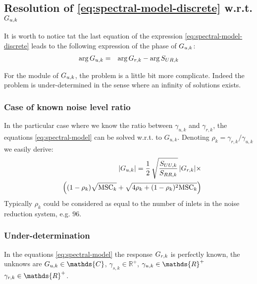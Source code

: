 






\subsection{Resolution of \eqref{eq:spectral-model-discrete} w.r.t. $G_{{u},k}$}

It is worth to notice tat the last equation of the expression \eqref{eq:spectral-model-discrete} leads to the following expression of the phase of $G_{{u},k}$:
\begin{eqnarray}
 \label{eq:phase-estimation}
 \arg G_{{u},k}&=& \arg G_{{r},k}- \arg S_{UR,k}
\end{eqnarray}

For the module of $G_{{u},k}$, the problem is a little bit more complicate. Indeed the problem is under-determined in the sense where an infinity of solutions exists. 

\subsubsection{Case of known noise level ratio}
In the particular case where we know the ratio between $\gamma_{u,k}$ and  $\gamma_{r,k}$, the equations \eqref{eq:spectral-model} can be solved w.r.t. to $G_{u,k}$. Denoting $\rho_{k}=\gamma_{r,k}/\gamma_{u,k}$ we easily derive:
\begin{eqnarray}
\label{eq:known-noise-ratio}
&&\hspace{-1cm}|G_{\ut,k}|=
\frac{1}{2}\,\sqrt{\frac{S_{UU,k}}{S_{RR,k}}}\,|G_{\rf, k}|\times 
\\&&\nonumber
\left(
(1-\rho_{k})\sqrt{\MSC_{k}}+\sqrt{4\rho_{k}+(1-\rho_{k})^{2}\MSC_{k}}
\right)
\end{eqnarray}
Typically $\rho_{k}$ could be considered as equal to the number of inlets in the noise reduction system, e.g. $96$.




\subsubsection{Under-determination}
In the equations \eqref{eq:spectral-model} the response $G_{{r},k}$ is perfectly known, the unknows are $G_{\ut,k}\in\mathds{C}$, $\gamma_{s,k}\in\mathds{R}^{+}$,  $\gamma_{\ut,k}\in\mathds{R}^{+}$
$\gamma_{\rf,k}\in\mathds{R}^{+}$. 
 
